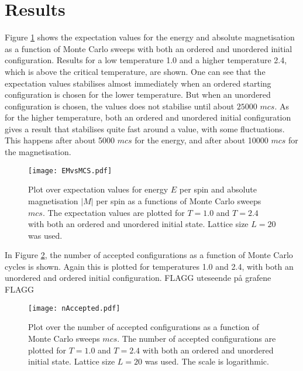 \section{Results}
\label{sec:results}
Figure \ref{fig:EMvsMCS} shows the expectation values for the energy and absolute magnetisation as a function of Monte Carlo sweeps with both an ordered and unordered initial configuration. Results for a low temperature 1.0 and a higher temperature 2.4, which is above the critical temperature, are shown. One can see that the expectation values stabilises almost immediately when an ordered starting configuration is chosen for the lower temperature. But when an unordered configuration is chosen, the values does not stabilise until about $25000$ $mcs$. As for the higher temperature, both an ordered and unordered initial configuration gives a result that stabilises quite fast around a value, with some fluctuations. This happens after about 5000 $mcs$ for the energy, and after about 10000 $mcs$ for the magnetisation.   
\begin{figure}[htbp]
	\centering
	\texttt{[image: EMvsMCS.pdf]}
	\caption{Plot over expectation values for energy $E$ per spin and absolute magnetisation $|M|$ per spin as a functions of Monte Carlo sweeps $mcs$. The expectation values are plotted for $T=1.0$ and $T=2.4$ with both an ordered and unordered initial state. Lattice size $L=20$ was used.}
	\label{fig:EMvsMCS}
\end{figure}

In Figure \ref{fig:nAccepted}, the number of accepted configurations as a function of Monte Carlo cycles is shown. Again this is plotted for temperatures 1.0 and 2.4, with both an unordered and ordered initial configuration. FLAGG uteseende på grafene FLAGG
\begin{figure}[htbp]
	\centering
	\texttt{[image: nAccepted.pdf]}
	\caption{Plot over the number of accepted configurations as a function of Monte Carlo sweeps $mcs$. The number of accepted configurations are plotted for $T=1.0$ and $T=2.4$ with both an ordered and unordered initial state. Lattice size $L=20$ was used. The scale is logarithmic.}
	\label{fig:nAccepted}
\end{figure}

